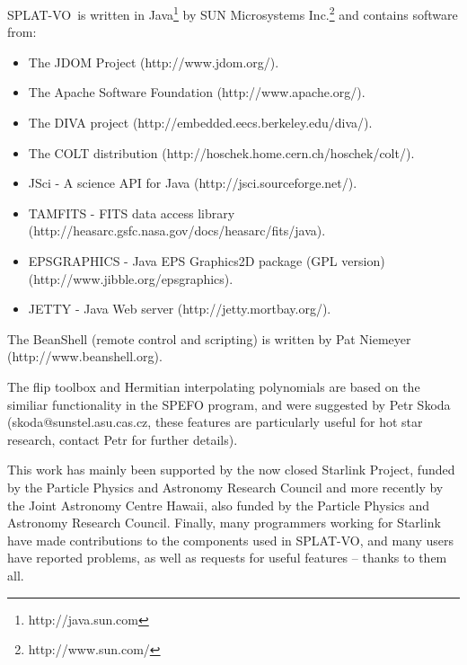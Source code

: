 \documentclass[twoside,11pt]{article}
\newcommand{\htmladdnormallinkfoot}[2]{#1\footnote{#2}}
\newcommand{\htmladdnormallink}[2]{#1}
\renewcommand{\_}{\texttt{\symbol{95}}}
\newcommand{\SPLAT}{\textsf{SPLAT-VO}}
\begin{document}
\SPLAT\ is written in
\htmladdnormallinkfoot{Java}{http://java.sun.com} by
\htmladdnormallinkfoot{SUN Microsystems Inc.}{http://www.sun.com/} and
contains software from:
\begin{itemize}
\item The JDOM Project (\htmladdnormallink{http://www.jdom.org/}
                                          {http://www.jdom.org/}).
\item The Apache Software Foundation
      (\htmladdnormallink{http://www.apache.org/}
                         {http://www.apache.org/}).
\item The DIVA project
      (\htmladdnormallink{http://embedded.eecs.berkeley.edu/diva/}
                         {http://embedded.eecs.berkeley.edu/diva/}).
\item The COLT distribution
      (\htmladdnormallink{http://hoschek.home.cern.ch/hoschek/colt/}
                         {http://hoschek.home.cern.ch/hoschek/colt/}).
\item JSci - A science API for Java
      (\htmladdnormallink{http://jsci.sourceforge.net/}
                         {http://jsci.sourceforge.net/}).
\item TAMFITS - FITS data access library
      (\htmladdnormallink{http://heasarc.gsfc.nasa.gov/docs/heasarc/fits/java}
                         {http://heasarc.gsfc.nasa.gov/docs/heasarc/fits/java}).
\item EPSGRAPHICS - Java EPS Graphics2D package (GPL version)
      (\htmladdnormallink{http://www.jibble.org/epsgraphics}
                         {http://www.jibble.org/epsgraphics}).
\item JETTY - Java Web server
      (\htmladdnormallink{http://jetty.mortbay.org/}
                         {http://jetty.mortbay.org/}).
\end{itemize}

The BeanShell (remote control and scripting) is written by Pat
Niemeyer (\htmladdnormallink{http://www.beanshell.org}
                            {http://www.beanshell.org}).

The flip toolbox and Hermitian interpolating polynomials are based on the
similiar functionality in the SPEFO program, and were suggested by Petr Skoda
(skoda@sunstel.asu.cas.cz, these features are particularly useful for hot star
research, contact Petr for further details).

This work has mainly been supported by the now closed
\htmladdnormallink{Starlink Project}{http://www.starlink.ac.uk}, funded by
the 
\htmladdnormallink{Particle Physics and Astronomy Research Council}{http://www.pparc.ac.uk}
and more recently by the 
\htmladdnormallink{Joint Astronomy Centre Hawaii}{http://www.jach.hawaii.edu},
also funded by the 
\htmladdnormallink{Particle Physics and Astronomy Research Council}{http://www.pparc.ac.uk}.
Finally, many programmers working for Starlink have made contributions to the
components used in \SPLAT, and many users have reported problems, as well as
requests for useful features -- thanks to them all.
\end{document}
